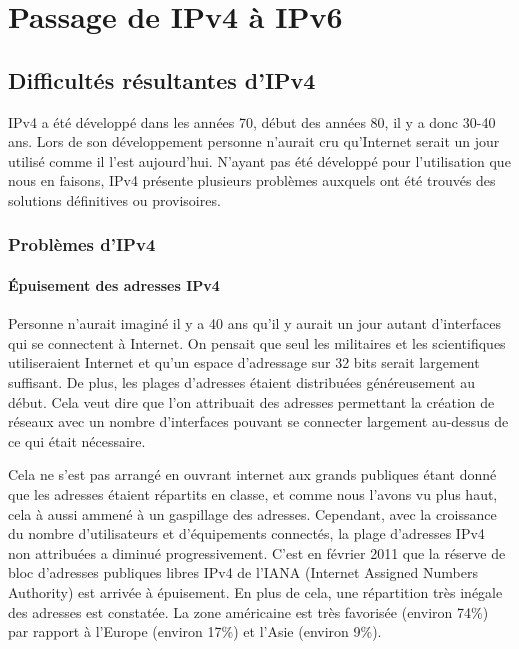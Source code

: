 \section{Passage de IPv4 à IPv6}
\label{sec:passage-IP4-IP6}

\subsection{Difficultés résultantes d'IPv4}
IPv4 a été développé dans les années 70, début des années 80, il y a donc 30-40
ans.  Lors de son développement personne n'aurait cru qu'Internet serait un
jour utilisé comme il l'est aujourd'hui. N'ayant pas été développé pour
l'utilisation que nous en faisons, IPv4 présente plusieurs problèmes auxquels
ont été trouvés des solutions définitives ou provisoires.

\subsubsection{Problèmes d'IPv4}

\paragraph{Épuisement des adresses IPv4}

Personne n'aurait imaginé il y a 40 ans qu'il y aurait un jour autant
d'interfaces qui se connectent à Internet. On pensait que seul les militaires
et les scientifiques utiliseraient Internet et qu'un espace d'adressage sur 32
bits serait largement suffisant.  De plus, les plages d'adresses étaient
distribuées généreusement au début.  Cela veut dire que l'on attribuait des
adresses permettant la création de réseaux avec un nombre d'interfaces pouvant
se connecter largement au-dessus de ce qui était nécessaire.

Cela ne s'est pas arrangé en ouvrant internet aux grands publiques étant donné
que les adresses étaient répartits en classe, et comme nous l'avons vu plus
haut, cela à aussi ammené à un gaspillage des adresses.  Cependant, avec la
croissance du nombre d'utilisateurs et d'équipements connectés, la plage
d'adresses IPv4 non attribuées a diminué progressivement. C'est en février 2011
que la réserve de bloc d'adresses publiques libres IPv4 de l'IANA (Internet
Assigned Numbers Authority) est arrivée à épuisement. En plus de cela, une
répartition très inégale des adresses est constatée.  La zone américaine est
très favorisée (environ 74\%) par rapport à l'Europe (environ 17\%) et l'Asie
(environ 9\%).


